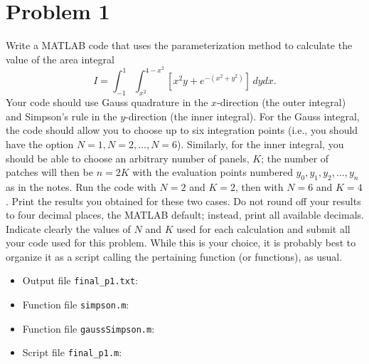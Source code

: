 \ifx\undefined\sol
\newpage
\fi
\section{Problem 1}%
\label{sec:problem_1}
Write a MATLAB code that uses the parameterization method to calculate the value of the area integral
\begin{equation*}
I = \int_{-1}^{1} \int_{x^{2}}^{4 - x^{2}} [x^{2} y + e^{-(x^{2} + y^{2})}] \, dy dx.
\end{equation*}
Your code should use Gauss quadrature in the $x$-direction (the outer integral) and Simpson's rule in the $y$-direction (the inner integral). For the Gauss integral, the code should allow you to choose up to six integration points (i.e., you should have the option $N =  1, N = 2, \ldots, N = 6$). Similarly, for the inner integral, you should be able to choose an arbitrary number of panels, $K$; the number of patches will then be $n = 2K$ with the evaluation points numbered $y_{0}, y_{1}, y_{2}, \ldots, y_{n}$ as in the notes. Run the code with $N = 2$ and $K = 2$, then with $N = 6$ and $K = 4$. Print the results you obtained for these two cases. Do not round off your results to four decimal places, the MATLAB default; instead, print all available decimals. Indicate clearly the values of $N$ and $K$ used for each calculation and submit all your code used for this problem. While this is your choice, it is probably best to organize it as a script calling the pertaining function (or functions), as usual.
\begin{solution}
  \quad
  \begin{itemize}
  \item Output file \verb|final_p1.txt|:
    
  \item Function file \verb|simpson.m|:
    
  \item Function file \verb|gaussSimpson.m|:
    
  \item Script file \verb|final_p1.m|:
    
  \end{itemize}
\end{solution}

